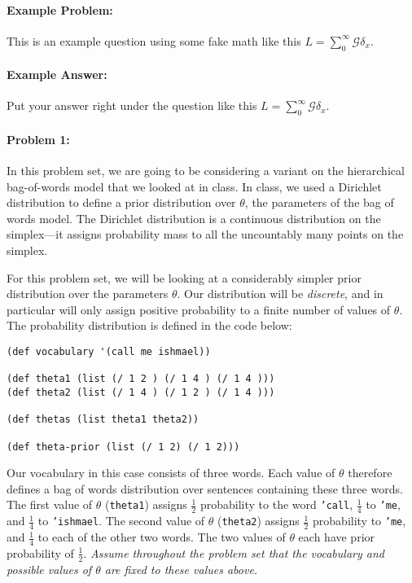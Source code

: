 \documentclass[10pt]{article}
\begin{document}
\noindent\hrulefill %

\paragraph{Example Problem:}
This is an example question using some fake math like this
$L=\sum_0^{\infty} \mathcal{G} \delta_x$.

\paragraph{Example Answer:} Put your answer right under the question like
this $L=\sum_0^{\infty} \mathcal{G} \delta_x$.

\noindent\hrulefill %

\paragraph{Problem 1:}
In this problem set, we are going to be considering a variant on the
hierarchical bag-of-words model that we looked at in class. In class,
we used a Dirichlet distribution to define a prior distribution over
$\theta$, the parameters of the bag of words model. The Dirichlet
distribution is a continuous distribution on the simplex---it assigns
probability mass to all the uncountably many points on the simplex.

For this problem set, we will be looking at a considerably simpler
prior distribution over the parameters $\theta$. Our distribution will
be \emph{discrete}, and in particular will only assign positive
probability to a finite number of values of $\theta$. The probability
distribution is defined in the code below:

\begin{lstlisting}
(def vocabulary '(call me ishmael))

(def theta1 (list (/ 1 2 ) (/ 1 4 ) (/ 1 4 )))
(def theta2 (list (/ 1 4 ) (/ 1 2 ) (/ 1 4 )))

(def thetas (list theta1 theta2))

(def theta-prior (list (/ 1 2) (/ 1 2)))
\end{lstlisting}

Our vocabulary in this case consists of three words. Each value of
$\theta$ therefore defines a bag of words distribution over sentences
containing these three words. The first value of $\theta$
(\texttt{theta1}) assigns $\frac{1}{2}$ probability to the word \texttt{'call},
$\frac{1}{4}$ to \texttt{'me}, and $\frac{1}{4}$ to \texttt{'ishmael}. The second value
of $\theta$ (\texttt{theta2}) assigns $\frac{1}{2}$ probability to
\texttt{'me}, and $\frac{1}{4}$ to each of the other two words. The two values
of $\theta$ each have prior probability of $\frac{1}{2}$. \emph{Assume
  throughout the problem set that the vocabulary and possible values
  of $\theta$ are fixed to these values above.}
\end{document}
